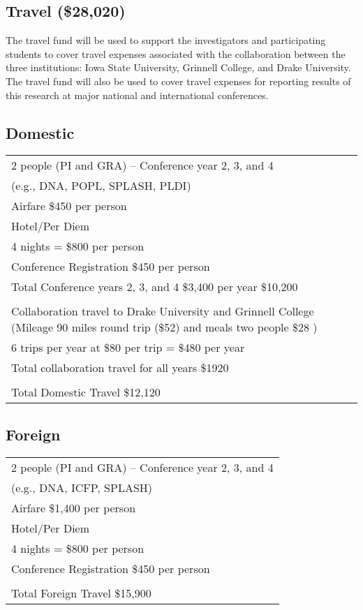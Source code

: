 \documentclass[12pt,letterpaper]{article}
\begin{document}
	\subsection*{Travel (\$28,020)}
	The travel fund will be used to support the investigators and participating students to cover travel expenses associated with the collaboration between the three institutions:  Iowa State University, Grinnell College, and Drake University.  The travel fund will also be used to cover travel expenses for reporting results of this research at major national and international conferences.
	
	\subsection*{Domestic}
	\begin{center}
	\begin{tabular}{|p{4in}|}
		\hline 2 people (PI and GRA) -- Conference year 2, 3, and 4 \\ (e.g., DNA, POPL, SPLASH, PLDI) \\
		\hline Airfare \$450 per person \\
		\hline Hotel/Per Diem\\  4 nights = \$800 per person \\
		\hline Conference Registration \$450 per person \\
		\hline Total Conference years 2, 3, and 4 \$3,400 per year \$10,200 \\
		\hline \\
		\hline Collaboration travel to Drake University and Grinnell College  (Mileage 90 miles round trip (\$52) and meals two people \$28 ) \\
		\hline 6 trips per year at \$80 per trip = \$480  per year\\
		\hline Total collaboration travel for all years \$1920\\
		\hline \\
		\hline Total Domestic Travel \$12,120 \\
		\hline
	\end{tabular}
\end{center}
	
	\subsection*{Foreign}
	\begin{center}
	\begin{tabular}{|p{4in}|}
		\hline 2 people (PI and GRA) -- Conference year 2, 3, and 4 \\ (e.g., DNA, ICFP, SPLASH) \\
		\hline Airfare \$1,400 per person\\
		\hline Hotel/Per Diem\\  4 nights = \$800 per person \\
		\hline Conference Registration \$450 per person \\
		\hline \\
		\hline Total Foreign Travel \$15,900 \\
		\hline
		\end{tabular}
		\end{center}
	
\end{document}
